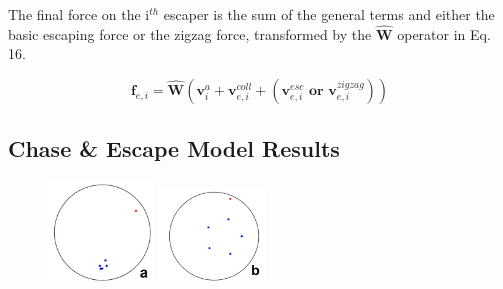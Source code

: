 \documentclass[%
11pt,
amsmath, amssymb,
aps,
pra
]{revtex4-2}
\newcommand{\threeImageSpacing}{0.25\textwidth}
\begin{document}
The final force on the i\(^{th}\) escaper is the sum of the general terms and either the basic escaping force or the zigzag
force, transformed by the \(\hat{\mathbf{W}}\) operator in Eq. 16.

\begin{equation}
    \mathbf{f}_{e, i} = \hat{\mathbf{W}}(\mathbf{v}_i^a + \mathbf{v}_{e, i}^{coll} + (\mathbf{v}_{e, i}^{esc} \textbf{ or } \mathbf{v}_{e, i}^{zigzag}))
\end{equation}

\subsection{Chase \& Escape Model Results}

\begin{figure}[tb]
    \includegraphics[width=\threeImageSpacing]{images/chaseescape/0.png}
    \includegraphics[width=\threeImageSpacing]{images/chaseescape/1.png}

\end{figure}
\end{document}
